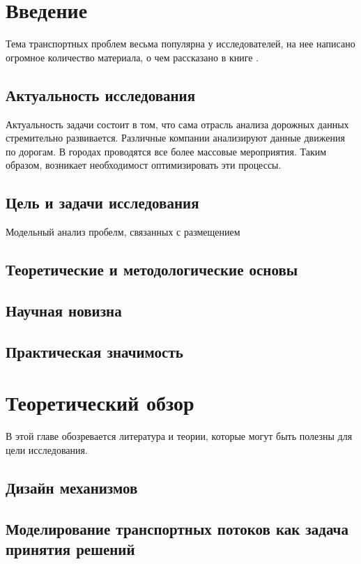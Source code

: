 \chapter{Введение}

Тема транспортных проблем весьма популярна у исследователей, на нее написано огромное количество материала, о чем рассказано в книге \cite{gas}.

\section{Актуальность исследования}

Актуальность задачи состоит в том, что сама отрасль анализа дорожных данных стремительно развивается. Различные компании анализируют данные движения по дорогам. В городах проводятся все более массовые мероприятия. Таким образом, возникает необходимост оптимизировать эти процессы.

\section{Цель и задачи исследования}
Модельный анализ пробелм, связанных с размещением

\section{Теоретические и методологические основы}
\section{Научная новизна}
\section{Практическая значимость}


\chapter{Теоретический обзор}

В этой главе обозревается литература и теории, которые могут быть полезны для цели исследования.

\section{Дизайн механизмов}


\section{Моделирование транспортных потоков как задача принятия решений}

